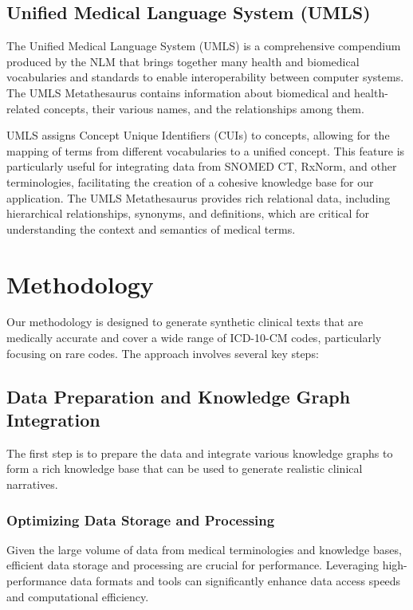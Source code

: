 \documentclass[12pt, a4paper]{article}
\begin{document}
\subsection{Unified Medical Language System (UMLS)}

The Unified Medical Language System (UMLS) is a comprehensive compendium produced by the NLM that brings together many health and biomedical vocabularies and standards to enable interoperability between computer systems. The UMLS Metathesaurus contains information about biomedical and health-related concepts, their various names, and the relationships among them.

UMLS assigns Concept Unique Identifiers (CUIs) to concepts, allowing for the mapping of terms from different vocabularies to a unified concept. This feature is particularly useful for integrating data from SNOMED CT, RxNorm, and other terminologies, facilitating the creation of a cohesive knowledge base for our application. The UMLS Metathesaurus provides rich relational data, including hierarchical relationships, synonyms, and definitions, which are critical for understanding the context and semantics of medical terms.

\section{Methodology}

Our methodology is designed to generate synthetic clinical texts that are medically accurate and cover a wide range of ICD-10-CM codes, particularly focusing on rare codes. The approach involves several key steps:

\subsection{Data Preparation and Knowledge Graph Integration}

The first step is to prepare the data and integrate various knowledge graphs to form a rich knowledge base that can be used to generate realistic clinical narratives.

\subsubsection{Optimizing Data Storage and Processing}

Given the large volume of data from medical terminologies and knowledge bases, efficient data storage and processing are crucial for performance. Leveraging high-performance data formats and tools can significantly enhance data access speeds and computational efficiency.
\end{document}
